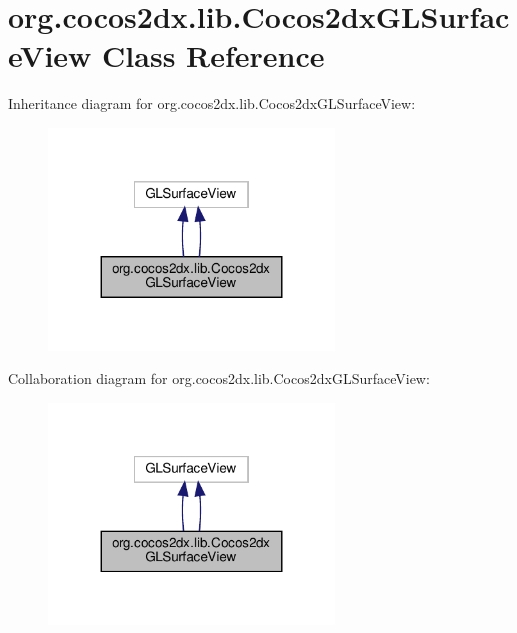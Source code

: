 \hypertarget{classorg_1_1cocos2dx_1_1lib_1_1Cocos2dxGLSurfaceView}{}\section{org.\+cocos2dx.\+lib.\+Cocos2dx\+G\+L\+Surface\+View Class Reference}
\label{classorg_1_1cocos2dx_1_1lib_1_1Cocos2dxGLSurfaceView}


Inheritance diagram for org.\+cocos2dx.\+lib.\+Cocos2dx\+G\+L\+Surface\+View\+:
\nopagebreak
\begin{figure}[H]
\begin{center}
\leavevmode
\includegraphics[width=215pt]{classorg_1_1cocos2dx_1_1lib_1_1Cocos2dxGLSurfaceView__inherit__graph}
\end{center}
\end{figure}


Collaboration diagram for org.\+cocos2dx.\+lib.\+Cocos2dx\+G\+L\+Surface\+View\+:
\nopagebreak
\begin{figure}[H]
\begin{center}
\leavevmode
\includegraphics[width=215pt]{classorg_1_1cocos2dx_1_1lib_1_1Cocos2dxGLSurfaceView__coll__graph}
\end{center}
\end{figure}
